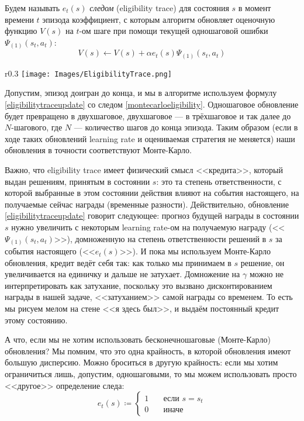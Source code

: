 \begin{definition}
Будем называть $e_t(s)$ \emph{следом} (eligibility trace) для состояния $s$ в момент времени $t$ эпизода коэффициент, с которым алгоритм обновляет оценочную функцию $V(s)$ на $t$-ом шаге при помощи текущей одношаговой ошибки $\Psi_{(1)}(s_t, a_t)$:
\begin{equation}\label{eligibilitytraceupdate}
    V(s) \leftarrow V(s) + \alpha e_t(s) \Psi_{(1)}(s_t, a_t)
\end{equation}
\end{definition}

\begin{wrapfigure}{r}{0.3\textwidth}
\vspace{-0.8cm}
\centering
\texttt{[image: Images/EligibilityTrace.png]}
\vspace{-0.6cm}
\end{wrapfigure}

Допустим, эпизод доигран до конца, и мы в алгоритме используем формулу \eqref{eligibilitytraceupdate} со следом \eqref{montecarloeligibility}. Одношаговое обновление будет превращено в двухшаговое, двухшаговое --- в трёхшаговое и так далее до $N$-шагового, где $N$ --- количество шагов до конца эпизода. Таким образом (если в ходе таких обновлений learning rate и оцениваемая стратегия не меняется) наши обновления в точности соответствуют Монте-Карло.

Важно, что eligibility trace имеет физический смысл <<кредита>>, который выдан решениям, принятым в состоянии $s$: это та степень ответственности, с которой выбранные в этом состоянии действия влияют на события настоящего, на получаемые сейчас награды (временные разности). Действительно, обновление \eqref{eligibilitytraceupdate} говорит следующее: прогноз будущей награды в состоянии $s$ нужно увеличить с некоторым learning rate-ом на получаемую награду (<<$\Psi_{(1)}(s_t, a_t)$>>), домноженную на степень ответственности решений в $s$ за события настоящего (<<$e_t(s)$>>). И пока мы используем Монте-Карло обновления, кредит ведёт себя так: как только мы принимаем в $s$ решение, он увеличивается на единичку и дальше не затухает. Домножение на $\gamma$ можно не интерпретировать как затухание, поскольку это вызвано дисконтированием награды в нашей задаче, <<затуханием>> самой награды со временем. То есть мы рисуем мелом на стене <<я здесь был>>, и выдаём постоянный кредит этому состоянию.

А что, если мы не хотим использовать бесконечношаговые (Монте-Карло) обновления? Мы помним, что это одна крайность, в которой обновления имеют большую дисперсию. Можно броситься в другую крайность: если мы хотим ограничиться лишь, допустим, одношаговыми, то мы можем использовать просто <<другое>> определение следа:
$$e_t(s) \coloneqq \begin{cases}
1 \quad & \text{если } s = s_t \\
0 \quad & \text{иначе}
\end{cases}$$

